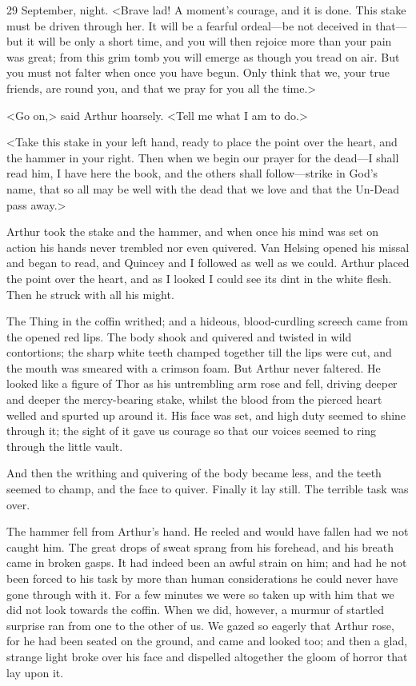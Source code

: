 \begin{diary}{29 September, night.}
<Brave lad! A moment's courage, and it is done. This stake must be driven through her. It will be a fearful ordeal—be not deceived in that—but it will be only a short time, and you will then rejoice more than your pain was great; from this grim tomb you will emerge as though you tread on air. But you must not falter when once you have begun. Only think that we, your true friends, are round you, and that we pray for you all the time.>

<Go on,> said Arthur hoarsely. <Tell me what I am to do.>

<Take this stake in your left hand, ready to place the point over the heart, and the hammer in your right. Then when we begin our prayer for the dead—I shall read him, I have here the book, and the others shall follow—strike in God's name, that so all may be well with the dead that we love and that the Un-Dead pass away.>

Arthur took the stake and the hammer, and when once his mind was set on action his hands never trembled nor even quivered. Van Helsing opened his missal and began to read, and Quincey and I followed as well as we could. Arthur placed the point over the heart, and as I looked I could see its dint in the white flesh. Then he struck with all his might.

The Thing in the coffin writhed; and a hideous, blood-curdling screech came from the opened red lips. The body shook and quivered and twisted in wild contortions; the sharp white teeth champed together till the lips were cut, and the mouth was smeared with a crimson foam. But Arthur never faltered. He looked like a figure of Thor as his untrembling arm rose and fell, driving deeper and deeper the mercy-bearing stake, whilst the blood from the pierced heart welled and spurted up around it. His face was set, and high duty seemed to shine through it; the sight of it gave us courage so that our voices seemed to ring through the little vault.

And then the writhing and quivering of the body became less, and the teeth seemed to champ, and the face to quiver. Finally it lay still. The terrible task was over.

The hammer fell from Arthur's hand. He reeled and would have fallen had we not caught him. The great drops of sweat sprang from his forehead, and his breath came in broken gasps. It had indeed been an awful strain on him; and had he not been forced to his task by more than human considerations he could never have gone through with it. For a few minutes we were so taken up with him that we did not look towards the coffin. When we did, however, a murmur of startled surprise ran from one to the other of us. We gazed so eagerly that Arthur rose, for he had been seated on the ground, and came and looked too; and then a glad, strange light broke over his face and dispelled altogether the gloom of horror that lay upon it.


\end{diary}
